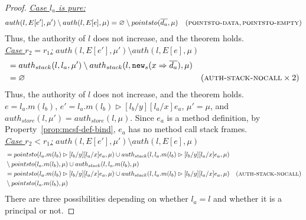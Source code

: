\documentclass{llncs}
\newcommand{\keywadj}[1]{\mathtt{#1}}
\begin{document}
\begin{proof}
\noindent\underline{\textit{Case $l_a$ is pure:}}
\vspace{-7pt}
\begin{align*}
auth(l, E[e'], \mu') \setminus auth(l, E[e], \mu) &= \varnothing \setminus pointsto(\overline{d_a}, \mu) & (\textsc{pointsto-data}, \textsc{pointsto-empty})
\end{align*}
Thus, the authority of $l$ does not increase, and the theorem holds.\\


\noindent\underline{\underline{\textit{Case $r_2 = r_1$:}}}
\noindent$auth(l, E[e'], \mu') \setminus auth(l, E[e], \mu)$
\vspace{-7pt}
\begin{align*}
&= auth_{stack}(l, l_a, \mu') \setminus auth_{stack}(l, \keywadj{new}_s(x \Rightarrow \overline{d_a}), \mu)\\
&= \varnothing & (\textsc{auth-stack-nocall} \times 2)
\end{align*}
Thus, the authority of $l$ does not increase, and the theorem holds.\\


\noindent{}
$e = l_a.m(l_b)$, \mbox{$e' = l_a.m(l_b) \rhd [l_b / y][l_a / x]e_a$}, \mbox{$\mu' = \mu$}, and $auth_{store}(l, \mu') = auth_{store}(l, \mu)$. Since $e_a$ is a method definition, by Property~\ref{prop:mcsf-def-bind}, $e_a$ has no method call stack frames.\\

\noindent\underline{\underline{\textit{Case $r_2 < r_1$:}}} \noindent$auth(l, E[e'], \mu') \setminus auth(l, E[e], \mu)$
\begin{align*}
&= pointsto(l_a.m(l_b) \rhd [l_b / y][l_a / x]e_a, \mu) \cup auth_{stack}(l, l_a.m(l_b) \rhd [l_b / y][l_a / x]e_a, \mu)\\
&\setminus pointsto(l_a.m(l_b), \mu) \cup auth_{stack}(l, l_a.m(l_b), \mu)\\
&= pointsto(l_a.m(l_b) \rhd [l_b / y][l_a / x]e_a, \mu) \cup auth_{stack}(l, l_a.m(l_b) \rhd [l_b / y][l_a / x]e_a, \mu) & (\textsc{auth-stack-nocall})\\
&\setminus pointsto(l_a.m(l_b), \mu)
\end{align*}
There are three possibilities depending on whether $l_a = l$ and whether it is a principal or not.


\end{proof}
\end{document}
